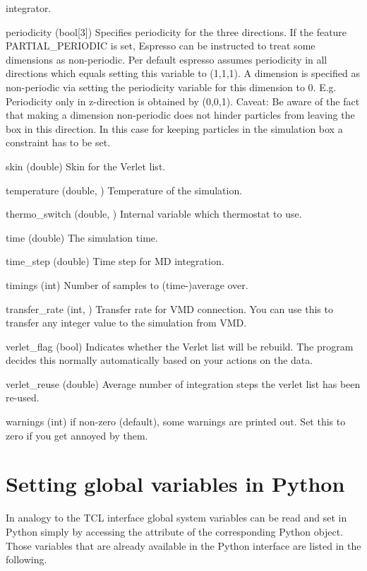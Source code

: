 \begin{globvar}
  integrator.
\item[periodicity] (bool[3]) Specifies periodicity for the three
  directions. If the feature PARTIAL_PERIODIC is set, Espresso can be instructed to treat some dimensions as non-periodic. Per default espresso assumes periodicity in all directions which equals setting this variable to (1,1,1). A dimension is specified as non-periodic via setting the periodicity variable for this dimension to 0. E.g. Periodicity only in z-direction is obtained by (0,0,1). Caveat: Be aware of the fact that making a dimension non-periodic does not hinder particles from leaving the box in this direction. In this case for keeping particles in the simulation box a constraint has to be set.
\item[skin] (double) Skin for the Verlet list.
\item [temperature] (double, \ro) Temperature of the
  simulation.
\item[thermo_switch] (double, \ro) Internal variable which thermostat
  to use. 
\item[time] (double) The simulation time.
\item[time_step] (double) Time step for MD integration.
\item[timings] (int) Number of samples to (time-)average over.
\item[transfer_rate] (int, \ro) Transfer rate for VMD connection. You
  can use this to transfer any integer value to the simulation from
  VMD.
\item[verlet_flag] (bool) Indicates whether the Verlet list will be
  rebuild. The program decides this normally automatically based on
  your actions on the data.
\item[verlet_reuse] (double) Average number of integration steps the
  verlet list has been re-used.
\item[warnings] (int) if non-zero (default), some warnings are printed
  out. Set this to zero if you get annoyed by them.
\end{globvar}


\section{Setting global variables in Python}
\label{sec:glob-vars-python}
In analogy to the TCL interface global system variables can be read and 
set in Python simply by accessing the attribute of the corresponding \es 
Python object. Those variables that are already available in the Python 
interface are listed in the following.

